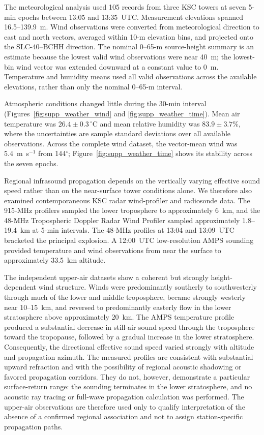 \documentclass[]{seismica}
\begin{document}
The meteorological analysis used 105 records from three KSC towers at seven
5-min epochs between 13:05 and 13:35~UTC. Measurement elevations spanned
16.5--139.9~m. Wind observations were converted from meteorological direction
to east and north vectors, averaged within 10-m elevation bins, and projected
onto the SLC-40--BCHH direction. The nominal 0--65-m source-height summary is
an estimate because the lowest valid wind observations were near 40~m; the
lowest-bin wind vector was extended downward at a constant value to 0~m.
Temperature and humidity means used all valid observations across the
available elevations, rather than only the nominal 0--65-m interval.

Atmospheric conditions changed little during the 30-min interval
(Figures~\ref{fig:supp_weather_wind} and
\ref{fig:supp_weather_time}). Mean air temperature was
$26.4\pm0.3\,^{\circ}$C and mean relative humidity was
$83.9\pm3.7\%$, where the uncertainties are sample standard deviations over
all available observations. Across the complete wind dataset, the vector-mean
wind was 5.4~m~s$^{-1}$ from 144$^\circ$; Figure~\ref{fig:supp_weather_time}
shows its stability across the seven epochs.

Regional infrasound propagation depends on the vertically varying effective
sound speed rather than on the near-surface tower conditions alone. We therefore
also examined contemporaneous KSC radar wind-profiler and radiosonde data. The
915-MHz profilers sampled the lower troposphere to approximately 6~km, and the
48-MHz Tropospheric Doppler Radar Wind Profiler sampled approximately
1.8--19.4~km at 5-min intervals. The 48-MHz profiles at 13:04 and 13:09~UTC
bracketed the principal explosion. A 12:00~UTC low-resolution AMPS sounding
provided temperature and wind observations from near the surface to
approximately 33.5~km altitude.

The independent upper-air datasets show a coherent but strongly
height-dependent wind structure. Winds were predominantly southerly to
southwesterly through much of the lower and middle troposphere, became strongly
westerly near 10--15~km, and reversed to predominantly easterly flow in the
lower stratosphere above approximately 20~km. The AMPS temperature profile
produced a substantial decrease in still-air sound speed through the
troposphere toward the tropopause, followed by a gradual increase in the lower
stratosphere. Consequently, the directional effective sound speed varied
strongly with altitude and propagation azimuth. The measured profiles are
consistent with substantial upward refraction and with the possibility of
regional acoustic shadowing or favored propagation corridors. They do not,
however, demonstrate a particular surface-return range: the sounding terminates
in the lower stratosphere, and no acoustic ray tracing or full-wave propagation
calculation was performed. The upper-air observations are therefore used only
to qualify interpretation of the absence of a confirmed regional association and not to assign
station-specific propagation paths.
\end{document}
